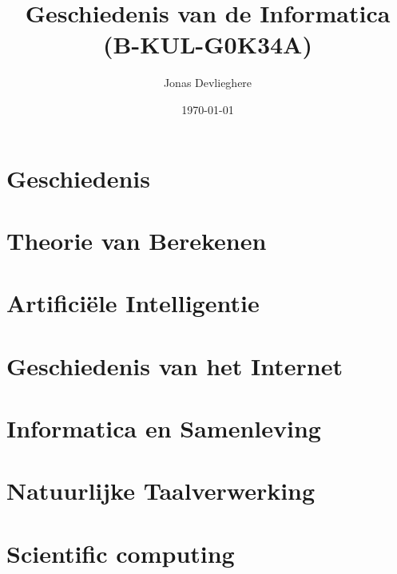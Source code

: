 \documentclass[11pt]{article}
\title{Geschiedenis van de Informatica \\ (B-KUL-G0K34A)}
\date{\today}
\author{Jonas Devlieghere}
\theoremstyle{definition}
\begin{document}
\maketitle

\tableofcontents

\newpage

\section{Geschiedenis}


\section{Theorie van Berekenen}


\section{Artificiële Intelligentie}


\section{Geschiedenis van het Internet}


\section{Informatica en Samenleving}


\section{Natuurlijke Taalverwerking}


\section{Scientific computing}


\appendix

\printindex



\nocite{*}
\end{document}
